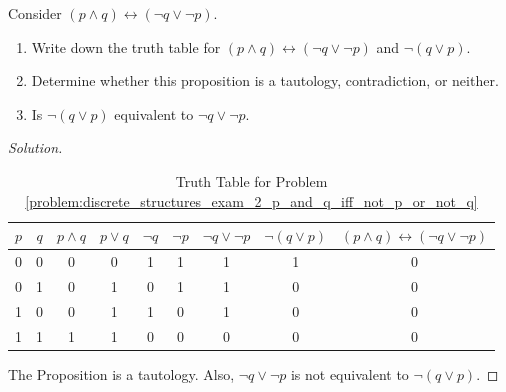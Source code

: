 \documentclass[../main.tex]{subfiles}
\begin{document}
\begin{problem}
\label{problem:discrete_structures_exam_2_p_and_q_iff_not_p_or_not_q}
Consider $(p\land q) \leftrightarrow (\neg q \lor \neg p)$.
\begin{enumerate}
\item Write down the truth table for $(p\land q)\leftrightarrow (\neg q \lor \neg p)$ and $\neg(q\lor p)$.
\item Determine whether this proposition is a tautology, contradiction, or neither.
\item Is $\neg(q\lor p)$ equivalent to $\neg q \lor \neg p$.
\end{enumerate}
\end{problem}
\begin{proof}[Solution]
%
\begin{table}[H]
    \centering
    \begin{tabular}{c c c c c c c c c} 
         \hline
         $p$ & $q$ & $p\land q$ & $p \lor q$ & $\neg q$ & $\neg p$ & $\neg q\lor \neg p$ & $\neg(q\lor p)$ & $(p\land q)\leftrightarrow(\neg q \lor \neg p)$ \\ [0.5ex] 
         \hline
         0 & 0 & 0 & 0 & 1 & 1  &   1 & 1  & 0	\\ 
         0 & 1 & 0 & 1 & 0 & 1  &   1 & 0  & 0	\\
         1 & 0 & 0 & 1 & 1 & 0  &   1 & 0  & 0	\\
         1 & 1 & 1 & 1 & 0 & 0  &	0 & 0  & 0	\\
         \hline
    \end{tabular}
    \caption{Truth Table for Problem \ref{problem:discrete_structures_exam_2_p_and_q_iff_not_p_or_not_q}}
    \label{tab:discrete_structures_Exam_II_Problem_3}
\end{table}
%
The Proposition is a tautology. Also, $\neg q \lor \neg p$ is not equivalent to $\neg(q \lor p)$.
\end{proof}
\end{document}
